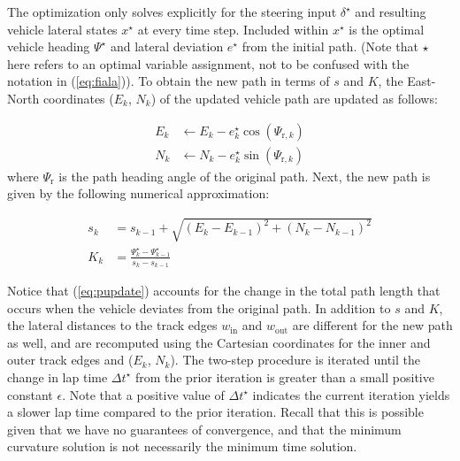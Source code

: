 \documentclass[twocolumn,10pt, final]{asme2e}
\begin{document}
The optimization only solves explicitly for the steering input $\delta^\star$ and resulting vehicle lateral states $x^\star$ at every 
time step. Included within $x^\star$  is the optimal vehicle heading $\Psi^\star$ and lateral deviation $e^\star$ from the initial path. (Note that $\star$ here refers to an optimal variable assignment, not to be confused with the notation in (\ref{eq:fiala})). To obtain 
the new path in terms of $s$ and $K$, the East-North coordinates ($E_k$, $N_k$) of the updated vehicle path are updated as follows:
 	
\begin{subequations}
\begin{align}
	E_k &\gets E_k - e^\star_k\cos(\Psi_{\mathrm{r},k})\\
	N_k &\gets N_k - e^\star_k\sin(\Psi_{\mathrm{r},k})
\end{align}
\end{subequations}
where $\Psi_\mathrm{r}$ is the path heading angle of the original path. Next, the new path is given by the following numerical approximation:
 
 \begin{subequations}
\begin{align}
	s_k &= s_{k-1} + \sqrt{(E_k - E_{k-1})^2 + (N_k - N_{k-1})^2}\\ \label{eq:pupdate}
	K_k &= \frac{\Psi^\star_k - \Psi^\star_{k-1}}{s_k - s_{k-1}}
\end{align}
\end{subequations}
  
 Notice that (\ref{eq:pupdate}) accounts for the change in the total path length that occurs when the vehicle deviates from the original path.
 In addition to $s$ and $K$, the lateral distances to the track edges $w_\mathrm{in}$ and $w_\mathrm{out}$ are different for the new path
 as well, and are recomputed using the Cartesian coordinates for
the inner and outer track edges and ($E_k$, $N_k$). The two-step procedure is iterated until the change in lap time $\Delta t^\star$ from the prior iteration is greater than a small positive 
constant $\epsilon$. Note that a positive value of $\Delta t^\star$ indicates the current iteration
yields a slower lap time compared to the prior iteration. Recall that this is possible given that we have no guarantees of convergence, and that the minimum curvature
solution is not necessarily the minimum time solution.
\end{document}
